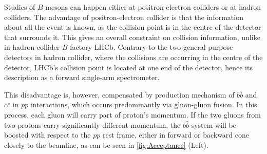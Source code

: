 Studies of $B$ mesons can happen either at positron-electron colliders or at hadron colliders. The advantage of positron-electron collider is that the information about all the event is known, as the collision point is in the centre of the detector that surrounds it. This gives an overall constraint on collision information, unlike in hadron collider $B$ factory \gls{LHCb}. Contrary to the two general purpose detectors in hadron collider, where the collisions are occurring in the centre of the detector, \Gls{LHCb}'s collision point is located at one end of the detector, hence its description as a forward single-arm spectrometer. 

This disadvantage is, however, compensated by production mechanism of $b\bar{b}$ and $c\bar{c}$ in $pp$ interactions, which occurs predominantly via gluon-gluon fusion. In this process, each gluon will carry part of proton's momentum. If the two gluons from two protons carry significantly different momentum, the $b\bar{b}$ system will be boosted with respect to the $pp$ rest frame, either in forward or backward cone closely to the beamline, as can be seen in \autoref{fig:Acceptance} (Left).


